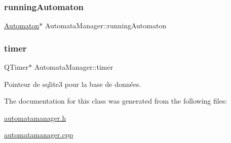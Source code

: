 \mbox{\label{class_automata_manager_af344a9b75f263a737cf98b9f14dd2d4d}} 
\subsubsection{\texorpdfstring{running\+Automaton}{runningAutomaton}}
{\footnotesize\ttfamily \mbox{\hyperlink{class_automaton}{Automaton}}$\ast$ Automata\+Manager\+::running\+Automaton\hspace{0.3cm}{\ttfamily [private]}}

\mbox{\label{class_automata_manager_a8538c7cc33bb64483a2ae3ab49938049}} 
\subsubsection{\texorpdfstring{timer}{timer}}
{\footnotesize\ttfamily Q\+Timer$\ast$ Automata\+Manager\+::timer\hspace{0.3cm}{\ttfamily [private]}}



Pointeur de sqlite3 pour la base de données. 



The documentation for this class was generated from the following files\+:\begin{DoxyCompactItemize}
\item 
\mbox{\hyperlink{automatamanager_8h}{automatamanager.\+h}}\item 
\mbox{\hyperlink{automatamanager_8cpp}{automatamanager.\+cpp}}\end{DoxyCompactItemize}
